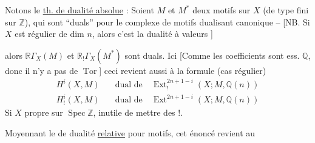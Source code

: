 Notons le \uline{th. de dualité absolue} : %
Soient $M$ et $M^*$ deux  motifs sur %
$X$ (de type fini sur $\mathbb{Z}$), qui sont %
\textquotedblleft duals\textquotedblright{} pour le \deleted{\unsure{\textup{[}}}complexe de motifs %
dualisant\deleted{\unsure{\textup{]}}} canonique -- [NB. Si $X$ %
est régulier  de dim $n$, alors %
c'est la dualité à valeurs  ] %

alors $\mathbb{R}\Gamma_X(M)$ et $\mathbb{R}_!\Gamma_X(M^*)$ sont %
duals. Ici [Comme les coefficients sont %
ess. $\mathbb{Q}$, donc il n'y a pas de $\operatorname{Tor}$] %
ceci revient aussi à la formule (cas régulier) %
\[
\boxed{\begin{aligned}
H^i(X,M)&\quad\text{dual de}\quad\operatorname{Ext}^{2n+1-i}_!(X;M,\mathbb{Q}(n))\\ %
H^i_!(X,M)&\quad\text{dual de}\quad\operatorname{Ext}^{2n+1-i}(X;M,\mathbb{Q}(n)) %
\end{aligned}}
\]
Si $X$ propre sur $\operatorname{Spec}\mathbb{Z}$, inutile de mettre %
des $!$. %

Moyennant le  de dualité \uline{relative} %
pour motifs, cet énoncé revient au %
